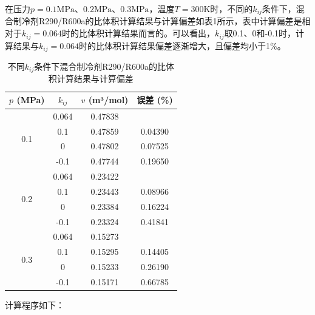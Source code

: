 \documentclass[12pt,a4paper]{article}
\begin{document}
在压力$p=0.1\mathrm{MPa}$、$0.2\mathrm{MPa}$、$0.3\mathrm{MPa}$，温度$T=300\mathrm{K}$时，不同的$k_{ij}$条件下，混合制冷剂R290/R600a的比体积计算结果与计算偏差如表1所示，表中计算偏差是相对于$k_{ij}=0.064$时的比体积计算结果而言的。可以看出，$k_{ij}$取0.1、0和-0.1时，计算结果与$k_{ij}=0.064$时的比体积计算结果偏差逐渐增大，且偏差均小于1\%。
\begin{table}[h]
\centering
\caption{不同$k_{ij}$条件下混合制冷剂R290/R600a的比体积计算结果与计算偏差}
\begin{tabular}{c c c c}
\hline
$p$ (MPa) & $k_{ij}$ &  $v$ (m³/mol) &误差 (\%) \\
\hline
\multirow{4}{*}{0.1} & 0.064 & 0.47838 &   \\
 & 0.1 & 0.47859 & 0.04390\\
 & 0 & 0.47802 & 0.07525  \\
 & -0.1 & 0.47744 & 0.19650  \\
\hline
\multirow{4}{*}{0.2} & 0.064 & 0.23422 &   \\
 & 0.1 & 0.23443 & 0.08966  \\
 & 0 & 0.23384 & 0.16224  \\
 & -0.1 & 0.23324 & 0.41841  \\
\hline
\multirow{4}{*}{0.3} & 0.064 & 0.15273 &   \\
 & 0.1 & 0.15295 & 0.14405  \\
 & 0 & 0.15233 & 0.26190  \\
 & -0.1 & 0.15171 & 0.66785  \\
\hline
\end{tabular}
\end{table}

计算程序如下：
\end{document}
